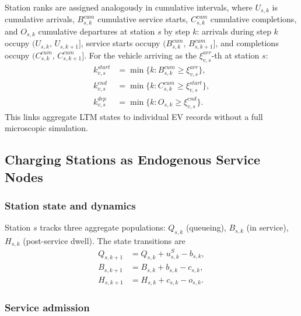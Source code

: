 Station ranks are assigned analogously in cumulative intervals,
where $U_{s,k}$ is cumulative arrivals, $B^{cum}_{s,k}$ cumulative service
starts, $C^{cum}_{s,k}$ cumulative completions, and $O_{s,k}$ cumulative
departures at station $s$ by step $k$:
arrivals during step $k$ occupy $(U_{s,k},\, U_{s,k+1}]$,
service starts occupy $(B^{cum}_{s,k},\, B^{cum}_{s,k+1}]$, and
completions occupy $(C^{cum}_{s,k},\, C^{cum}_{s,k+1}]$.
For the vehicle arriving as the $\xi^{arr}_{v,s}$-th at station $s$:
\begin{align}
  k^{start}_{v,s} &= \min\!\bigl\{k : B^{cum}_{s,k} \ge \xi^{arr}_{v,s}\bigr\},
    \label{eq:charge-start}\\
  k^{end}_{v,s}   &= \min\!\bigl\{k : C^{cum}_{s,k} \ge \xi^{start}_{v,s}\bigr\},
    \label{eq:charge-end}\\
  k^{dep}_{v,s}   &= \min\!\bigl\{k : O_{s,k} \ge \xi^{end}_{v,s}\bigr\}.
    \label{eq:station-dep}
\end{align}
This links aggregate LTM states to individual EV records without a full
microscopic simulation.

\subsection{Charging Stations as Endogenous Service Nodes}
\label{sec:traffic-charging-station}

\subsubsection{Station state and dynamics}

Station $s$ tracks three aggregate populations:
$Q_{s,k}$ (queueing), $B_{s,k}$ (in service), $H_{s,k}$ (post-service dwell).
The state transitions are
\begin{align}
  Q_{s,k+1} &= Q_{s,k} + u^S_{s,k} - b_{s,k},
    \label{eq:st-Q}\\
  B_{s,k+1} &= B_{s,k} + b_{s,k}   - c_{s,k},
    \label{eq:st-B}\\
  H_{s,k+1} &= H_{s,k} + c_{s,k}   - o_{s,k}.
    \label{eq:st-H}
\end{align}

\subsubsection{Service admission}

